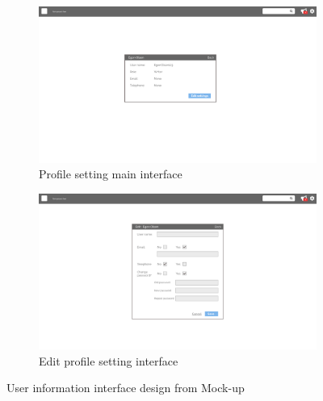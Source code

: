 \begin{figure}[H]\ContinuedFloat
	\centering
	\begin{subfigure}[b]{0.48\textwidth}
		\includegraphics[width=\textwidth]{billeder/iteration3Prototyper/Page_27.jpg}
		\caption{Profile setting main interface}
		\label{fig:5-Profile}
	\end{subfigure}
	\quad
	\begin{subfigure}[b]{0.48\textwidth}
		\includegraphics[width=\textwidth]{billeder/iteration3Prototyper/Page_28.jpg}
		\caption{Edit profile setting interface}
		\label{fig:5-ProfileEdit}
	\end{subfigure}
	\caption{User information interface design from Mock-up}\label{fig:5-UserMockUp}
\end{figure}


